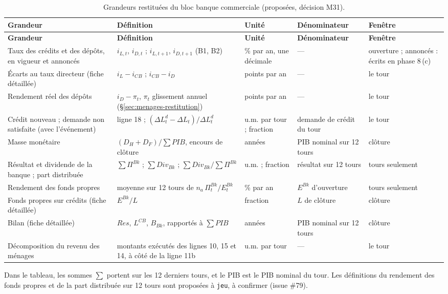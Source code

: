 \documentclass[11pt,a4paper]{article}
\begin{document}
\begin{center}\small
\setlength{\tabcolsep}{4pt}
\begin{longtable}{>{\raggedright\arraybackslash}p{2.6cm}>{\raggedright\arraybackslash}p{4.9cm}>{\raggedright\arraybackslash}p{1.8cm}>{\raggedright\arraybackslash}p{2.6cm}>{\raggedright\arraybackslash}p{2.5cm}}
\caption{Grandeurs restituées du bloc banque commerciale (proposées, décision M31).}\label{tab:banque-restitution}\\
\toprule
\textbf{Grandeur} & \textbf{Définition} & \textbf{Unité} & \textbf{Dénominateur} & \textbf{Fenêtre}\\
\midrule
\endfirsthead
\toprule
\textbf{Grandeur} & \textbf{Définition} & \textbf{Unité} & \textbf{Dénominateur} & \textbf{Fenêtre}\\
\midrule
\endhead
Taux des crédits et des dépôts, en vigueur et annoncés & $i_{L,t}$, $i_{D,t}$ ; $i_{L,t+1}$, $i_{D,t+1}$ (B1, B2) & \% par an, une décimale & --- & ouverture ; annoncés : écrits en phase 8\,(c)\\
Écarts au taux directeur (fiche détaillée) & $i_L - i_{\mathit{CB}}$ ; $i_{\mathit{CB}} - i_D$ & points par an & --- & le tour\\
Rendement réel des dépôts & $i_D - \pi_t$, $\pi_t$ glissement annuel (\S\ref{sec:menages-restitution}) & points par an & --- & le tour\\
Crédit nouveau ; demande non satisfaite (avec l'événement) & ligne 18 ; $(\Delta L^d_t - \Delta L_t)/\Delta L^d_t$ & u.m. par tour ; fraction & demande de crédit du tour & le tour\\
Masse monétaire & $(D_H + D_F)/\sum \mathit{PIB}$, encours de clôture & années & PIB nominal sur 12 tours & clôture\\
Résultat et dividende de la banque ; part distribuée & $\sum \Pi^{\mathit{Bk}}$ ; $\sum \mathit{Div}_{\mathit{Bk}}$ ; $\sum \mathit{Div}_{\mathit{Bk}}/\sum \Pi^{\mathit{Bk}}$ & u.m. ; fraction & résultat sur 12 tours & 12 tours seulement\\
Rendement des fonds propres & moyenne sur 12 tours de $n_a\,\Pi^{\mathit{Bk}}_t/E^{\mathit{Bk}}_t$ & \% par an & $E^{\mathit{Bk}}$ d'ouverture & 12 tours seulement\\
Fonds propres sur crédits (fiche détaillée) & $E^{\mathit{Bk}}/L$ & fraction & $L$ de clôture & clôture\\
Bilan (fiche détaillée) & $\mathit{Res}$, $L^{\mathit{CB}}$, $B_{\mathit{Bk}}$, rapportés à $\sum \mathit{PIB}$ & années & PIB nominal sur 12 tours & clôture\\
Décomposition du revenu des ménages & montants exécutés des lignes 10, 15 et 14, à côté de la ligne 11b & u.m. par tour & --- & le tour\\
\bottomrule
\end{longtable}
\end{center}
Dans le tableau, les sommes $\sum$ portent sur les 12 derniers tours, et le PIB est le PIB nominal du tour. Les définitions du rendement des fonds propres et de la part distribuée sur 12 tours sont proposées à \texttt{jeu}, à confirmer (issue \#79).
\end{document}
